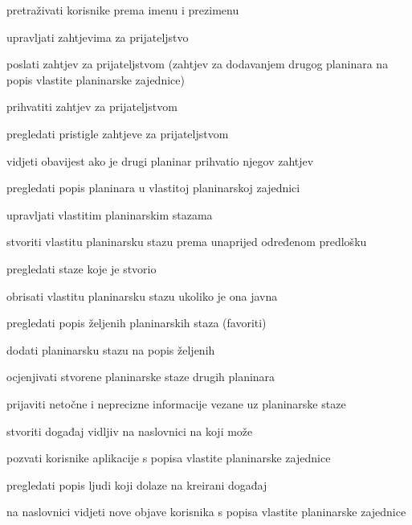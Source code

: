 \begin{packed_enum}
\begin{packed_enum}
\begin{packed_enum}
						\end{packed_enum}
					\item pretraživati korisnike prema imenu i prezimenu
					\item upravljati zahtjevima za prijateljstvo
					
						\begin{packed_enum}
							\item poslati zahtjev za prijateljstvom (zahtjev za dodavanjem drugog planinara na popis vlastite planinarske zajednice)
							\item prihvatiti zahtjev za prijateljstvom
							\item pregledati pristigle zahtjeve za prijateljstvom
							\item vidjeti obavijest ako je drugi planinar prihvatio njegov zahtjev
						\end{packed_enum}
					
					\item pregledati popis planinara u vlastitoj planinarskoj zajednici
					\item upravljati vlastitim planinarskim stazama
					\begin{packed_enum}
						\item stvoriti vlastitu planinarsku stazu prema unaprijed određenom predlošku
						\item pregledati staze koje je stvorio
						\item obrisati vlastitu planinarsku stazu ukoliko je ona javna
					\end{packed_enum}
					\item pregledati popis željenih planinarskih staza (favoriti)
					\item dodati planinarsku stazu na popis željenih
					\item ocjenjivati stvorene planinarske staze drugih planinara
					\item prijaviti netočne i neprecizne informacije vezane uz planinarske staze
					\item stvoriti događaj vidljiv na naslovnici na koji može
						\begin{packed_enum}
							
							\item  pozvati korisnike aplikacije s popisa vlastite planinarske zajednice 
							\item  pregledati popis ljudi koji dolaze na kreirani događaj
							
						\end{packed_enum}
					\item na naslovnici vidjeti nove objave korisnika s popisa vlastite planinarske zajednice
						\begin{packed_enum}
					

\end{packed_enum}
\end{packed_enum}
\end{packed_enum}
